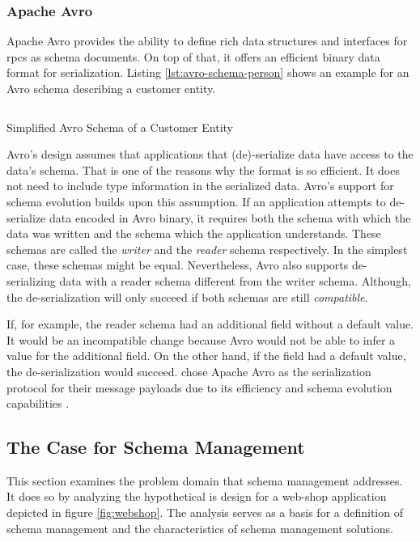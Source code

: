 \subsubsection{Apache Avro}

Apache Avro provides the ability to define rich data structures and interfaces for \glspl{rpc} as schema documents.
On top of that, it offers an efficient binary data format for serialization.
Listing \ref{lst:avro-schema-person} shows an example for an Avro schema describing a customer entity.
\parencite{apache_software_foundation_apache_2021}

\begin{listing}[H]
  \inputminted{json}{assets/src/Customer.avsc}
  \caption{Simplified Avro Schema of a Customer Entity}\label{lst:avro-schema-person}
\end{listing}

Avro's design assumes that applications that (de)-serialize data have access to the data's schema.
That is one of the reasons why the format is so efficient.
It does not need to include type information in the serialized data.
Avro's support for schema evolution builds upon this assumption.
If an application attempts to de-serialize data encoded in Avro binary, it requires both the schema with which the data was written and the schema which the application understands.
These schemas are called the \emph{writer} and the \emph{reader} schema respectively.
In the simplest case, these schemas might be equal.
Nevertheless, Avro also supports de-serializing data with a reader schema different from the writer schema.
Although, the de-serialization will only succeed if both schemas are still \emph{compatible}.
\parencite{apache_software_foundation_apache_2021}

If, for example, the reader schema had an additional field without a default value.
It would be an incompatible change because Avro would not be able to infer a value for the additional field.
On the other hand, if the field had a default value, the de-serialization would succeed.
\citeauthor{kreps_kafka_2011} chose Apache Avro as the serialization protocol for their message payloads due to its efficiency and schema evolution capabilities \parencite{kreps_kafka_2011}. 

\subsection{The Case for Schema Management}

This section examines the problem domain that schema management addresses.
It does so by analyzing the hypothetical \gls{is} design for a web-shop application depicted in figure \ref{fig:webshop}.
The analysis serves as a basis for a definition of schema management and the characteristics of schema management solutions.

